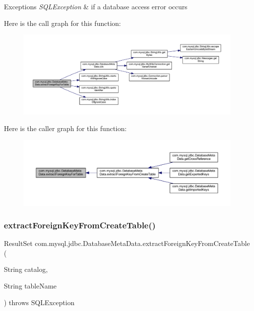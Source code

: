 \begin{DoxyExceptions}{Exceptions}
{\em S\+Q\+L\+Exception} & if a database access error occurs \\
\hline
\end{DoxyExceptions}
Here is the call graph for this function\+:\nopagebreak
\begin{figure}[H]
\begin{center}
\leavevmode
\includegraphics[width=350pt]{classcom_1_1mysql_1_1jdbc_1_1_database_meta_data_ac9b74074950b106a415701c336002c18_cgraph}
\end{center}
\end{figure}
Here is the caller graph for this function\+:\nopagebreak
\begin{figure}[H]
\begin{center}
\leavevmode
\includegraphics[width=350pt]{classcom_1_1mysql_1_1jdbc_1_1_database_meta_data_ac9b74074950b106a415701c336002c18_icgraph}
\end{center}
\end{figure}
\mbox{\label{classcom_1_1mysql_1_1jdbc_1_1_database_meta_data_a674d55ea080a7c9051cbb85224526184}} 
\subsubsection{\texorpdfstring{extract\+Foreign\+Key\+From\+Create\+Table()}{extractForeignKeyFromCreateTable()}}
{\footnotesize\ttfamily Result\+Set com.\+mysql.\+jdbc.\+Database\+Meta\+Data.\+extract\+Foreign\+Key\+From\+Create\+Table (\begin{DoxyParamCaption}\item[{String}]{catalog,  }\item[{String}]{table\+Name }\end{DoxyParamCaption}) throws S\+Q\+L\+Exception}

